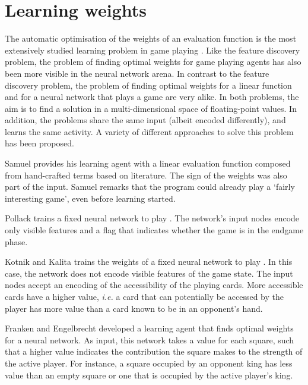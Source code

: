 \section{Learning weights}
\label{sec:learning-weights}
The automatic optimisation of the weights of an evaluation function is the most extensively studied learning problem in game playing \cite{furnkranz:survey}. Like the feature discovery problem, the problem of finding optimal weights for game playing agents has also been more visible in the neural network arena.  In contrast to the feature discovery problem, the problem of finding optimal weights for a linear function and for a neural network that plays a game are very alike.  In both problems, the aim is to find a solution in a multi-dimensional space of floating-point values.  In addition, the problems share the same input (albeit encoded differently), and learns the same activity.  A variety of different approaches to solve this problem has been proposed. 

Samuel \cite{samuel:checkers} provides his  learning agent with a linear evaluation function composed from hand-crafted terms based on  literature.  The sign of the weights was also part of the input.  Samuel remarks that the program could already play a `fairly interesting game', even before learning started.  

Pollack \etal \cite{pollack:player} trains a fixed neural network to play .  The network's input nodes encode only visible features and a flag that indicates whether the game is in the endgame phase. 

Kotnik and Kalita \cite{kotnik:significance} trains the weights of a fixed neural network to play .  In this case, the network does not encode visible features of the game state. The input nodes accept an encoding of the accessibility of the playing cards.  More accessible cards have a higher value, {\it i.e.} a card that can potentially be accessed by the player has more value than a card known to be in an opponent's hand.   

Franken and Engelbrecht \cite{franken:checkers} developed a  learning agent that finds optimal weights for a neural network.  As input, this network takes a value for each square, such that a higher value indicates the contribution the square makes to the strength of the active player.  For instance, a square occupied by an opponent king has less value than an empty square or one that is occupied by the active player's king.  
 
